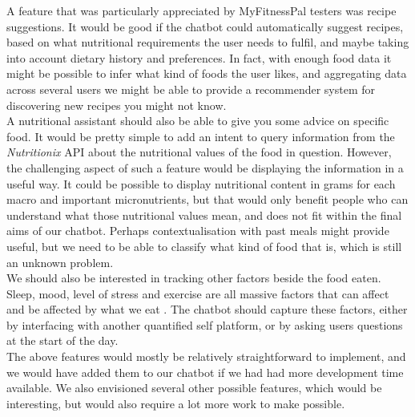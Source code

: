 A feature that was particularly appreciated by MyFitnessPal testers was recipe suggestions. It would be good if the chatbot could automatically suggest recipes, based on what nutritional requirements the user needs to fulfil, and maybe taking into account dietary history and preferences. In fact, with enough food data it might be possible to infer what kind of foods the user likes, and aggregating data across several users we might be able to provide a recommender system for discovering new recipes you might not know. \\
A nutritional assistant should also be able to give you some advice on specific food. It would be pretty simple to add an intent to query information from the \textit{Nutritionix} API about the nutritional values of the food in question. However, the challenging aspect of such a feature would be displaying the information in a useful way. It could be possible to display nutritional content in grams for each macro and important micronutrients, but that would only benefit people who can understand what those nutritional values mean, and does not fit within the final aims of our chatbot. Perhaps contextualisation with past meals might provide useful, but we need to be able to classify what kind of food that is, which is still an unknown problem.\\
We should also be interested in tracking other factors beside the food eaten. Sleep, mood, level of stress and exercise are all massive factors that can affect and be affected by what we eat \cite{buman2015physical}. The chatbot should capture these factors, either by interfacing with another quantified self platform, or by asking users questions at the start of the day. \\
The above features would mostly be relatively straightforward to implement, and we would have added them to our chatbot if we had had more development time available. We also envisioned several other possible features, which would be interesting, but would also require a lot more work to make possible. \\
